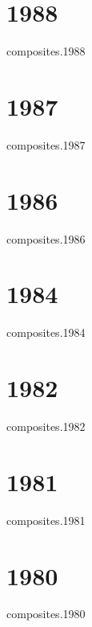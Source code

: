 \documentclass[12pt]{article}
\begin{document}
\section*{1988}
\begin{btSect}{composites.1988}
\btPrintAll
\end{btSect}
%
\section*{1987}
\begin{btSect}{composites.1987}
\btPrintAll
\end{btSect}
%
\section*{1986}
\begin{btSect}{composites.1986}
\btPrintAll
\end{btSect}
%
\section*{1984}
\begin{btSect}{composites.1984}
\btPrintAll
\end{btSect}
%
%
\section*{1982}
\begin{btSect}{composites.1982}
\btPrintAll
\end{btSect}
%
\section*{1981}
\begin{btSect}{composites.1981}
\btPrintAll
\end{btSect}

\section*{1980}
\begin{btSect}{composites.1980}
\btPrintAll
\end{btSect}
\end{document}
